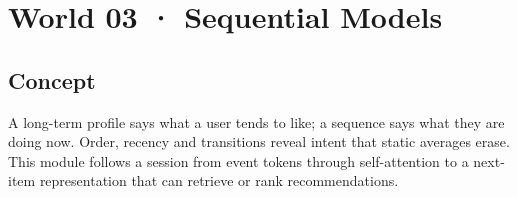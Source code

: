 \section{World 03 · Sequential Models}

\begin{abstract}
Order turns a bag of preferences into a changing intent. Attention learns which earlier events matter now.
\end{abstract}

\subsection{Concept}
A long-term profile says what a user tends to like; a sequence says what they are doing now. Order, recency and transitions reveal intent that static averages erase. This module follows a session from event tokens through self-attention to a next-item representation that can retrieve or rank recommendations.
